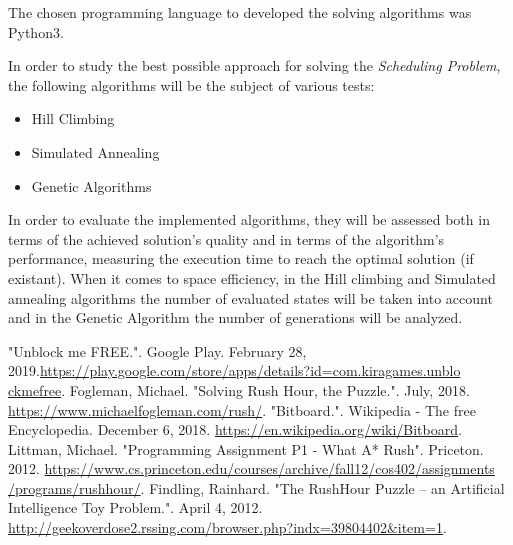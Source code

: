 \documentclass[conference]{IEEEtran}
\begin{document}
The chosen programming language to developed the solving algorithms was Python3.

In order to study the best possible approach for solving the \textit{Scheduling Problem}, the following algorithms will be the subject of various tests:
\begin{itemize}
    \item Hill Climbing
    \item Simulated Annealing
    \item Genetic Algorithms
\end{itemize}

In order to evaluate the implemented algorithms, they will be assessed both in terms of the achieved solution's quality and in terms of the algorithm's performance, measuring the execution time to reach the optimal solution (if existant). When it comes to space efficiency, in the Hill climbing and Simulated annealing algorithms the number of evaluated states will be taken into account and in the Genetic Algorithm the number of generations will be analyzed.

\begin{thebibliography}{00}
    
 "Unblock me FREE.". Google Play. February 28, 2019.\href{https://play.google.com/store/apps/details?id=com.kiragames.unblockmefree}{https://play.google.com/store/apps/details?id=com.kiragames.unblo\\ckmefree}.
 Fogleman, Michael. "Solving Rush Hour, the Puzzle.". July, 2018. \href{https://www.michaelfogleman.com/rush/}{https://www.michaelfogleman.com/rush/}.
 "Bitboard.". Wikipedia - The free Encyclopedia. December 6, 2018. \href{https://en.wikipedia.org/wiki/Bitboard}{https://en.wikipedia.org/wiki/Bitboard}.
 Littman, Michael. "Programming Assignment P1 - What A* Rush". Priceton. 2012. \href{https://www.cs.princeton.edu/courses/archive/fall12/cos402/assignments/programs/rushhour/}{https://www.cs.princeton.edu/courses/archive/fall12/cos402/assignments\\/programs/rushhour/}.
 Findling, Rainhard. "The RushHour Puzzle – an Artificial Intelligence Toy Problem.". April 4, 2012. \href{http://geekoverdose2.rssing.com/browser.php?indx=39804402\&item=1}{http://geekoverdose2.rssing.com/browser.php?indx=39804402\&item=1}.

\end{thebibliography}
\end{document}
